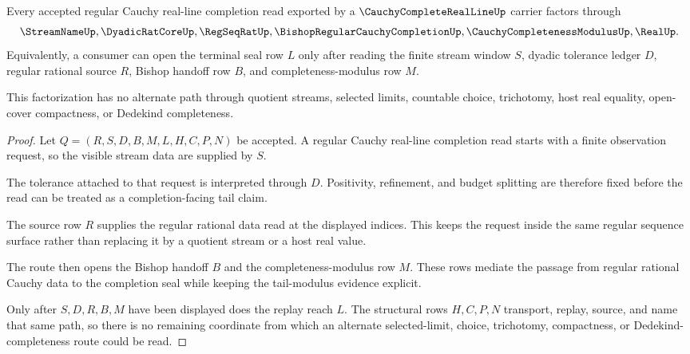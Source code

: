 \begin{theorem}
\label{thm:cauchy-complete-real-line-regular-limit-route}
Every accepted regular Cauchy real-line completion read exported by a $\CauchyCompleteRealLineUp$ carrier factors through
$$
\StreamNameUp,\DyadicRatCoreUp,\RegSeqRatUp,\BishopRegularCauchyCompletionUp,\CauchyCompletenessModulusUp,\RealUp .
$$
Equivalently, a consumer can open the terminal seal row $L$ only after reading the finite stream window $S$, dyadic tolerance ledger $D$, regular rational source $R$, Bishop handoff row $B$, and completeness-modulus row $M$.

This factorization has no alternate path through quotient streams, selected limits, countable choice, trichotomy, host real equality, open-cover compactness, or Dedekind completeness.
\end{theorem}
\begin{proof}
Let $Q=(R,S,D,B,M,L,H,C,P,N)$ be accepted. A regular Cauchy real-line completion read starts with a finite observation request, so the visible stream data are supplied by $S$.

The tolerance attached to that request is interpreted through $D$. Positivity, refinement, and budget splitting are therefore fixed before the read can be treated as a completion-facing tail claim.

The source row $R$ supplies the regular rational data read at the displayed indices. This keeps the request inside the same regular sequence surface rather than replacing it by a quotient stream or a host real value.

The route then opens the Bishop handoff $B$ and the completeness-modulus row $M$. These rows mediate the passage from regular rational Cauchy data to the completion seal while keeping the tail-modulus evidence explicit.

Only after $S,D,R,B,M$ have been displayed does the replay reach $L$. The structural rows $H,C,P,N$ transport, replay, source, and name that same path, so there is no remaining coordinate from which an alternate selected-limit, choice, trichotomy, compactness, or Dedekind-completeness route could be read.
\end{proof}


